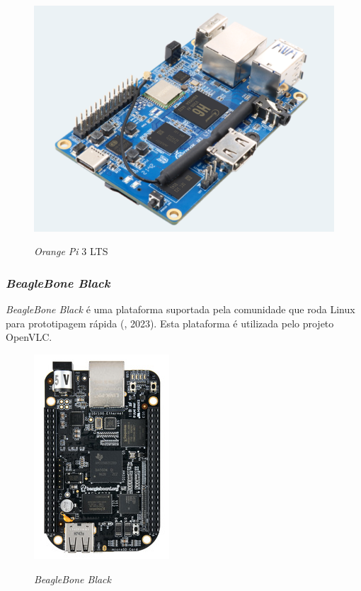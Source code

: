 \begin{figure}[!htbp]
  \caption{\textit{Orange Pi} 3 LTS}
  \includegraphics[scale=0.35]{images/orange.png}
  \label{figura:orange}
\end{figure}

\newpage

\subsubsection{\textit{BeagleBone Black}}

\textit{BeagleBone Black} é uma plataforma suportada pela comunidade que roda Linux para prototipagem rápida (\textit{\citeauthor{beaglebone}}, 2023).
Esta plataforma é utilizada pelo projeto OpenVLC. 

\begin{figure}[!htbp]
  \caption{\textit{BeagleBone Black}}
  \includegraphics[scale=0.58]{images/beaglebone.png}
  \label{figura:beagle}
\end{figure}


